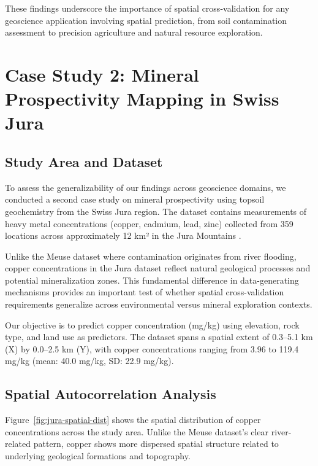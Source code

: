 \documentclass[a4paper,fleqn]{cas-sc}
\begin{document}
These findings underscore the importance of spatial cross-validation for any geoscience application involving spatial prediction, from soil contamination assessment to precision agriculture and natural resource exploration.


\section{Case Study 2: Mineral Prospectivity Mapping in Swiss Jura}
\label{sec:case-study-jura}

\subsection{Study Area and Dataset}

To assess the generalizability of our findings across geoscience domains, we conducted a second case study on mineral prospectivity using topsoil geochemistry from the Swiss Jura region. The dataset contains measurements of heavy metal concentrations (copper, cadmium, lead, zinc) collected from 359 locations across approximately 12 km² in the Jura Mountains \citep{goovaerts1997geostatistics}.

Unlike the Meuse dataset where contamination originates from river flooding, copper concentrations in the Jura dataset reflect natural geological processes and potential mineralization zones. This fundamental difference in data-generating mechanisms provides an important test of whether spatial cross-validation requirements generalize across environmental versus mineral exploration contexts.

Our objective is to predict copper concentration (mg/kg) using elevation, rock type, and land use as predictors. The dataset spans a spatial extent of 0.3--5.1 km (X) by 0.0--2.5 km (Y), with copper concentrations ranging from 3.96 to 119.4 mg/kg (mean: 40.0 mg/kg, SD: 22.9 mg/kg).

\subsection{Spatial Autocorrelation Analysis}

Figure~\ref{fig:jura-spatial-dist} shows the spatial distribution of copper concentrations across the study area. Unlike the Meuse dataset's clear river-related pattern, copper shows more dispersed spatial structure related to underlying geological formations and topography.
\end{document}
